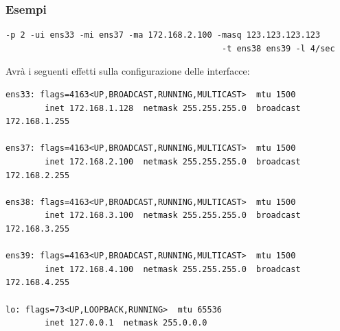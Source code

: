 \documentclass{beamer}
\begin{document}
\begin{frame}[fragile]
    \frametitle{Esempi}
    \begin{lstlisting}
-p 2 -ui ens33 -mi ens37 -ma 172.168.2.100 -masq 123.123.123.123 
                                            -t ens38 ens39 -l 4/sec

            \end{lstlisting}
    Avrà i seguenti effetti sulla configurazione delle interfacce:
    \begin{lstlisting}
ens33: flags=4163<UP,BROADCAST,RUNNING,MULTICAST>  mtu 1500
        inet 172.168.1.128  netmask 255.255.255.0  broadcast 172.168.1.255

ens37: flags=4163<UP,BROADCAST,RUNNING,MULTICAST>  mtu 1500
        inet 172.168.2.100  netmask 255.255.255.0  broadcast 172.168.2.255

ens38: flags=4163<UP,BROADCAST,RUNNING,MULTICAST>  mtu 1500
        inet 172.168.3.100  netmask 255.255.255.0  broadcast 172.168.3.255

ens39: flags=4163<UP,BROADCAST,RUNNING,MULTICAST>  mtu 1500
        inet 172.168.4.100  netmask 255.255.255.0  broadcast 172.168.4.255

lo: flags=73<UP,LOOPBACK,RUNNING>  mtu 65536
        inet 127.0.0.1  netmask 255.0.0.0
    \end{lstlisting}
\end{frame}


    

\end{document}
